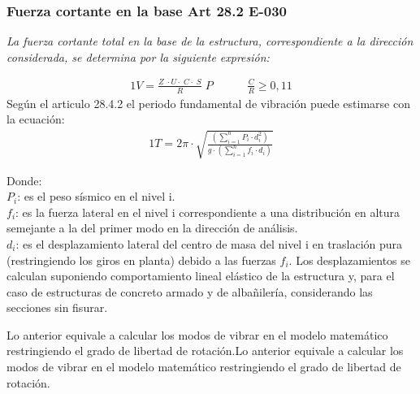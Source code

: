 \documentclass{article}%
\begin{document}
\subsubsection{Fuerza cortante en la base Art 28.2 E{-}030}%
\label{ssubsec:FuerzacortanteenlabaseArt28.2E{-}030}%
\begin{tcolorbox}[colback=gray!5!white,colframe=Maroon!75!black,fonttitle=\bfseries,title=Art. 28.2.1]%
\textit{La fuerza cortante total en la base de la estructura, correspondiente a la dirección considerada, se determina por la siguiente expresión:}%
\end{tcolorbox}%
\begin{alignat}{1}%
V=\frac{Z\;\cdot U\cdot\;C\cdot\;S}{R}\;P\;\;\;\;\;\;\;\;\;\;\;\frac{C}{R}\geq 0,11%
\end{alignat}%
Según el articulo 28.4.2 el periodo fundamental de vibración puede estimarse con la ecuación:%
\begin{alignat}{1}%
T=2\pi\cdot \displaystyle\sqrt{\frac{\left (\displaystyle\sum_{i=1}^{n} P_{i}\cdot d_{i}^{2}\right )}{g\cdot\left (\displaystyle\sum_{i=1}^{n}f_{i}\cdot d_{i}  \right ) }}%
\end{alignat}%
\begin{flushleft}%
Donde:\\%
$P_{i}$: es el peso sísmico en el nivel i.\\%
$f_{i}$: es la fuerza lateral en el nivel i correspondiente a una distribución en altura semejante a la del primer modo en la dirección de análisis.\\%
$d_{i}$: es el desplazamiento lateral del centro de masa del nivel  i en traslación pura (restringiendo los giros en planta) debido a las fuerzas $f_{i}$. Los desplazamientos se calculan suponiendo comportamiento lineal elástico de la estructura y, para el caso de estructuras de concreto armado y de albañilería, considerando las secciones sin fisurar.\\%
\end{flushleft}%
Lo anterior equivale a calcular los modos de vibrar en el modelo matemático restringiendo el grado de libertad de rotación.Lo anterior equivale a calcular los modos de vibrar en el modelo matemático restringiendo el grado de libertad de rotación.%
\end{document}
